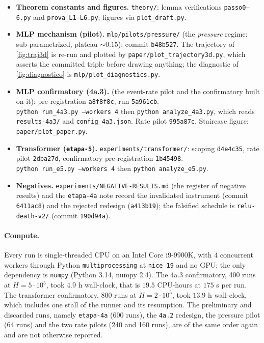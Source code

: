 \documentclass[11pt]{article}
\theoremstyle{definition}
\theoremstyle{remark}
\begin{document}
{\sloppy
\begin{itemize}
\item \textbf{Theorem constants and figures.} \texttt{theory/}: lemma
verifications \texttt{passo0--6.py} and \texttt{prova\_L1--L6.py}; figures via
\texttt{plot\_draft.py}.
\item \textbf{MLP mechanism (pilot).}
\texttt{mlp/pilots/pressure/} (the \emph{pressure} regime:
sub-parametrized, plateau $\sim0.15$); commit \texttt{b48b527}. The trajectory of
\cref{fig:traj3d} is re-run and plotted by
\texttt{paper/plot\_trajectory3d.py}, which asserts the committed
triple before drawing anything; the diagnostic of \cref{fig:diagnostico} is
\texttt{mlp/plot\_diagnostics.py}.
\item \textbf{MLP confirmatory (4a.3).}  (the
event-rate pilot and the confirmatory built on it): pre-registration
\texttt{a8f8f8c}, run \texttt{5a961cb}.\\
\texttt{python run\_4a3.py --workers 4} then \texttt{python analyze\_4a3.py},
which reads \texttt{results-4a3/} and \texttt{config\_4a3.json}. Rate pilot
\texttt{995a87c}. Staircase figure: \texttt{paper/plot\_paper.py}.
\item \textbf{Transformer (\texttt{etapa-5}).} \texttt{experiments/transformer/}:
scoping \texttt{d4e4c35}, rate pilot \texttt{2dba27d}, confirmatory
pre-registration \texttt{1b45498}. \\
\texttt{python run\_e5.py --workers 4} then \texttt{python analyze\_e5.py}.
\item \textbf{Negatives.} \texttt{experiments/NEGATIVE-RESULTS.md} (the register of
negative results) and the \texttt{etapa-4a} note record the invalidated instrument
(commit \texttt{6411ac8}) and the rejected redesign (\texttt{a413b19}); the
falsified schedule is \texttt{relu-death-v2/} (commit \texttt{190d94a}).
\end{itemize}
\par}

\paragraph{Compute.}
Every run is single-threaded CPU on an Intel Core i9-9900K, with 4 concurrent
workers through Python \texttt{multiprocessing} at \texttt{nice 19} and no GPU;
the only dependency is \texttt{numpy} (Python 3.14, numpy 2.4). The 4a.3
confirmatory, 400 runs at $H=5\cdot10^{5}$, took $4.9$ h wall-clock, that is
$19.5$ CPU-hours at $175$ s per run. The transformer confirmatory, 800 runs at
$H=2\cdot10^{5}$, took $13.9$ h wall-clock, which includes one stall of the
runner and its resumption. The preliminary and discarded
runs, namely \texttt{etapa-4a} (600 runs), the \texttt{4a.2} redesign, the pressure pilot (64
runs) and the two rate pilots (240 and 160 runs), are of the same order again and
are not otherwise reported.
\end{document}
